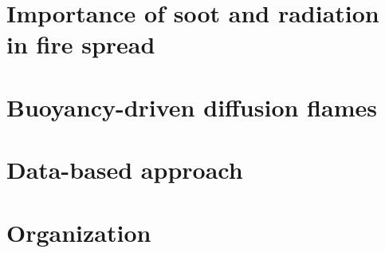 \section{Importance of soot and radiation in fire spread}
 

\section{Buoyancy-driven diffusion flames}
\section{Data-based approach}

\section{Organization}
